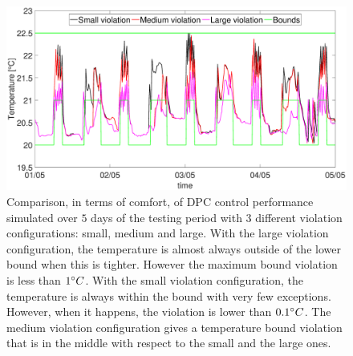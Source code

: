 \begin{figure}[t!]
	\begin{center}
		\includegraphics[width=28pc]{figures/Temperatures_all.eps}
	\end{center}
	\caption{Comparison, in terms of comfort, of DPC control performance simulated over $5$ days of the testing period with $3$ different violation configurations: small, medium and large. With the large violation configuration, the temperature is almost always outside of the lower bound when this is tighter. However the maximum bound violation is less than $1\degree C$. With the small violation configuration, the temperature is always within the bound with very few exceptions. However, when it happens, the violation is lower than $0.1\degree C$. The medium violation configuration gives a temperature bound violation that is in the middle with respect to the small and the large ones.}
	\label{F:comparison_all_temperature}
\end{figure}
